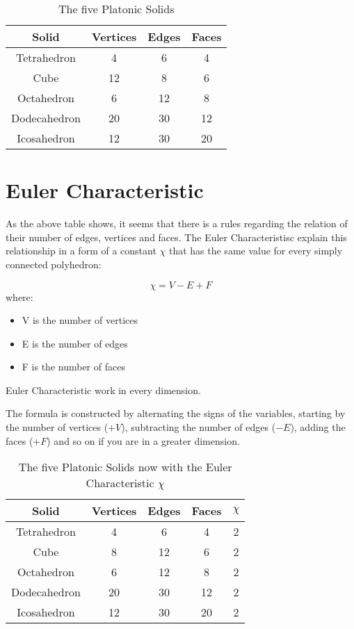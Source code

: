 \begin{table}[h]
\centering
\begin{tabular}{|c|c|c|c|}
\hline
Solid & Vertices & Edges & Faces \\
\hline
Tetrahedron  & 4   & 6   & 4   \\
Cube         & 12  & 8   & 6   \\
Octahedron   & 6   & 12  & 8   \\
Dodecahedron & 20  & 30  & 12  \\
Icosahedron  & 12  & 30  & 20  \\    
\hline
\end{tabular}
\caption{The five Platonic Solids}
\label{tab:simple}
\end{table}

\section{Euler Characteristic}
As the above table shows, it seems that there is a rules regarding the relation of their number of edges, vertices and faces. The Euler Characteristisc explain this relationship in a form of a constant $\chi$ that has the same value for every simply connected polyhedron:

\begin{equation*}
    \chi = V - E + F
\end{equation*}
where:
\begin{itemize}
    \item V is the number of vertices
    \item E is the number of edges
    \item F is the number of faces
\end{itemize}

Euler Characteristic work in every dimension.\par The formula is constructed by alternating the signs of the variables, starting by the number of vertices ($+V$), subtracting the number of edges ($-E$), adding the faces ($+F$) and so on if you are in a greater dimension. 

\begin{table}[h]
\centering
\begin{tabular}{|c|c|c|c|c|}
\hline
Solid & Vertices & Edges & Faces & $\chi$ \\
\hline
Tetrahedron  & 4   & 6   & 4  & 2  \\
Cube         & 8  &  12  & 6  & 2 \\
Octahedron   & 6   & 12  & 8  & 2 \\
Dodecahedron & 20  & 30  & 12 & 2 \\
Icosahedron  & 12  & 30  & 20 & 2 \\    
\hline
\end{tabular}
\caption{The five Platonic Solids now with the Euler Characteristic $\chi$}
\label{tab:simple}
\end{table}

